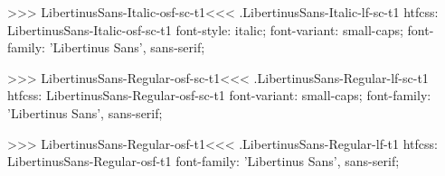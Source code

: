 {{{{>>>
\<LibertinusSans-Italic-osf-sc-t1\><<<
.LibertinusSans-Italic-lf-sc-t1
htfcss:  LibertinusSans-Italic-osf-sc-t1  font-style: italic; font-variant: small-caps; font-family: 'Libertinus Sans', sans-serif;

>>>
\<LibertinusSans-Regular-osf-sc-t1\><<<
.LibertinusSans-Regular-lf-sc-t1
htfcss:  LibertinusSans-Regular-osf-sc-t1  font-variant: small-caps; font-family: 'Libertinus Sans', sans-serif;

>>>
\<LibertinusSans-Regular-osf-t1\><<<
.LibertinusSans-Regular-lf-t1
htfcss:  LibertinusSans-Regular-osf-t1  font-family: 'Libertinus Sans', sans-serif;

}}}}
